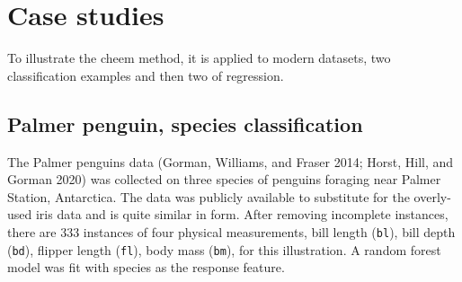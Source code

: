 \documentclass[
]{article}
\begin{document}
\hypertarget{sec:casestudies}{%
\section{Case studies}\label{sec:casestudies}}

To illustrate the cheem method, it is applied to modern datasets, two classification examples and then two of regression.

\hypertarget{palmer-penguin-species-classification}{%
\subsection{Palmer penguin, species classification}\label{palmer-penguin-species-classification}}

The Palmer penguins data (Gorman, Williams, and Fraser 2014; Horst, Hill, and Gorman 2020) was collected on three species of penguins foraging near Palmer Station, Antarctica. The data was publicly available to substitute for the overly-used iris data and is quite similar in form. After removing incomplete instances, there are 333 instances of four physical measurements, bill length (\texttt{bl}), bill depth (\texttt{bd}), flipper length (\texttt{fl}), body mass (\texttt{bm}), for this illustration. A random forest model was fit with species as the response feature.
\end{document}

